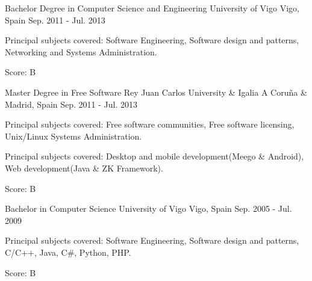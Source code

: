 

\begin{cventries}

  \cventry
    {Bachelor Degree in Computer Science and Engineering} %
    {University of Vigo} %
    {Vigo, Spain} %
    {Sep. 2011 - Jul. 2013} %
    {
      \begin{cvitems} %
	\item {Principal subjects covered: Software Engineering, Software design and patterns, Networking and Systems Administration.}
	\item {Score: B}
      \end{cvitems}
    }

  \cventry
    {Master Degree in Free Software} %
    {Rey Juan Carlos University \& Igalia} %
    {A Coruña \& Madrid, Spain} %
    {Sep. 2011 - Jul. 2013} %
    {
      \begin{cvitems} %
	\item {Principal subjects covered: Free software communities, Free software licensing, Unix/Linux Systems Administration.}
	\item {Principal subjects covered: Desktop and mobile development(Meego \& Android), Web development(Java \& ZK Framework).}
	\item {Score: B}
      \end{cvitems}
    }

  \cventry
    {Bachelor in Computer Science} %
    {University of Vigo} %
    {Vigo, Spain} %
    {Sep. 2005 - Jul. 2009} %
    {
      \begin{cvitems} %
	\item {Principal subjects covered: Software Engineering, Software design and patterns, C/C++, Java, C\#, Python, PHP.}
	\item {Score: B}
      \end{cvitems}
    }


\end{cventries}
